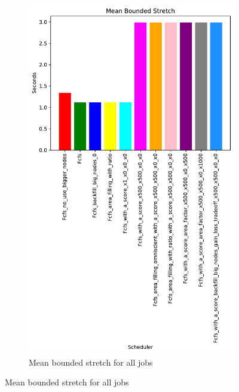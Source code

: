 \documentclass[a4paper]{article}
\begin{document}
\begin{figure}[H]\centering
\begin{subfigure}[b]{0.4\linewidth}\centering\includegraphics[width=0.7\linewidth]{MBSS/plot/Results_Size_And_Data_2022-03-01->2022-03-03_V10000_Mean_Stretch_With_a_Minimum_450_128_32_256_4_1024.pdf}\caption{Mean bounded stretch for all jobs}\label{45}\end{subfigure}

\end{figure}
\end{document}
